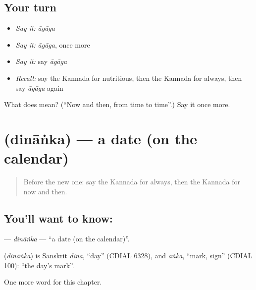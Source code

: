 \subsection*{Your turn}
\begin{itemize}
\raggedright
  \item \emph{Say it:} \emph{āgāga}
  \item \emph{Say it:} \emph{āgāga}, once more
  \item \emph{Say it:} say \emph{āgāga}
  \item \emph{Recall:} say the Kannada for nutritious, then the Kannada for always, then say \emph{āgāga} again
\end{itemize}

\begin{tcolorbox}[breakable,colback=teal!4,colframe=teal!35!black,title={Before you move on}]
What does  mean? (\textquotedblleft{}Now and then, from time to time\textquotedblright{}.) Say it once more.
\end{tcolorbox}
\section[\texorpdfstring{\kn{ದಿನಾಂಕ} (dināṅka)}{ದಿನಾಂಕ (dināṅka)}]{ (dināṅka) — a date (on the calendar)}

\label{lesson:KA-C171-dinanka}



\begin{quote}
Before the new one: say the Kannada for always, then the Kannada for now and then.
\end{quote}

\subsection*{You'll want to know: }
\textbf{} — \emph{dināṅka} — \textquotedblleft{}a date (on the calendar)\textquotedblright{}.

\begin{cousinweb}
\textbf{} (\emph{dināṅka}) is Sanskrit \emph{dina}, \textquotedblleft{}day\textquotedblright{} (CDIAL 6328), and \emph{aṅka}, \textquotedblleft{}mark, sign\textquotedblright{} (CDIAL 100): \textquotedblleft{}the day's mark\textquotedblright{}.
\end{cousinweb}

\begin{grammarlens}[title={What you've built}]
One more word for this chapter.
\end{grammarlens}

